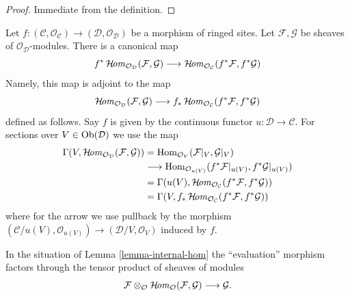 \begin{proof}
Immediate from the definition.
\end{proof}

\begin{remark}
\label{remark-pullback-internal-hom}
Let $f : (\mathcal{C}, \mathcal{O}_\mathcal{C}) \to
(\mathcal{D}, \mathcal{O}_\mathcal{D})$ be a morphism
of ringed sites. Let
$\mathcal{F}, \mathcal{G}$ be sheaves of $\mathcal{O}_\mathcal{D}$-modules.
There is a canonical map
$$
f^*\mathop{\mathcal{H}\!\mathit{om}}\nolimits_{\mathcal{O}_\mathcal{D}}(\mathcal{F}, \mathcal{G})
\longrightarrow
\mathop{\mathcal{H}\!\mathit{om}}\nolimits_{\mathcal{O}_\mathcal{C}}(f^*\mathcal{F}, f^*\mathcal{G})
$$
Namely, this map is adjoint to the map
$$
\mathop{\mathcal{H}\!\mathit{om}}\nolimits_{\mathcal{O}_\mathcal{D}}(\mathcal{F}, \mathcal{G})
\longrightarrow
f_*\mathop{\mathcal{H}\!\mathit{om}}\nolimits_{\mathcal{O}_\mathcal{C}}(f^*\mathcal{F}, f^*\mathcal{G})
$$
defined as follows. Say $f$ is given by the continuous functor
$u : \mathcal{D} \to \mathcal{C}$. For sections over $V \in \mathop{\mathrm{Ob}}\nolimits(\mathcal{D})$
we use the map
\begin{align*}
\Gamma(V, \mathop{\mathcal{H}\!\mathit{om}}\nolimits_{\mathcal{O}_\mathcal{D}}(\mathcal{F}, \mathcal{G}))
& =
\mathop{\mathrm{Hom}}\nolimits_{\mathcal{O}_V}(\mathcal{F}|_V, \mathcal{G}|_V) \\
& \longrightarrow
\mathop{\mathrm{Hom}}\nolimits_{\mathcal{O}_{u(V)}}(f^*\mathcal{F}|_{u(V)}, f^*\mathcal{G}|_{u(V)}) \\
& =
\Gamma(u(V), \mathop{\mathcal{H}\!\mathit{om}}\nolimits_{\mathcal{O}_\mathcal{C}}(f^*\mathcal{F},
f^*\mathcal{G})) \\
& =
\Gamma(V, f_*\mathop{\mathcal{H}\!\mathit{om}}\nolimits_{\mathcal{O}_\mathcal{C}}(f^*\mathcal{F},
f^*\mathcal{G}))
\end{align*}
where for the arrow we use pullback by the morphism
$(\mathcal{C}/u(V), \mathcal{O}_{u(V)}) \to
(\mathcal{D}/V, \mathcal{O}_V)$ induced by $f$.
\end{remark}

\noindent
In the situation of Lemma \ref{lemma-internal-hom}
the ``evaluation'' morphism
factors through the tensor product of sheaves of modules
$$
\mathcal{F}
\otimes_\mathcal{O}
\mathop{\mathcal{H}\!\mathit{om}}\nolimits_\mathcal{O}(\mathcal{F}, \mathcal{G})
\longrightarrow
\mathcal{G}.
$$

